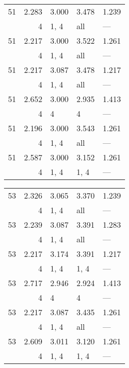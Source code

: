 \begin{tabular}{lrlll}
\toprule
 51 & 2.283 & 3.000 & 3.478 & 1.239 \\
    & 4     & 1, 4  & all   & ---   \\
 51 & 2.217 & 3.000 & 3.522 & 1.261 \\
    & 4     & 1, 4  & all   & ---   \\
 51 & 2.217 & 3.087 & 3.478 & 1.217 \\
    & 4     & 1, 4  & all   & ---   \\
 51 & 2.652 & 3.000 & 2.935 & 1.413 \\
    & 4     & 4     & 4     & ---   \\
 51 & 2.196 & 3.000 & 3.543 & 1.261 \\
    & 4     & 1, 4  & all   & ---   \\
 51 & 2.587 & 3.000 & 3.152 & 1.261 \\
    & 4     & 1, 4  & 1, 4  & ---   \\
\bottomrule
\end{tabular}
\begin{tabular}{lrlll}
\toprule
 53 & 2.326 & 3.065 & 3.370 & 1.239 \\
    & 4     & 1, 4  & all   & ---   \\
 53 & 2.239 & 3.087 & 3.391 & 1.283 \\
    & 4     & 1, 4  & all   & ---   \\
 53 & 2.217 & 3.174 & 3.391 & 1.217 \\
    & 4     & 1, 4  & 1, 4  & ---   \\
 53 & 2.717 & 2.946 & 2.924 & 1.413 \\
    & 4     & 4     & 4     & ---   \\
 53 & 2.217 & 3.087 & 3.435 & 1.261 \\
    & 4     & 1, 4  & all   & ---   \\
 53 & 2.609 & 3.011 & 3.120 & 1.261 \\
    & 4     & 1, 4  & 1, 4  & ---   \\
\bottomrule
\end{tabular}
